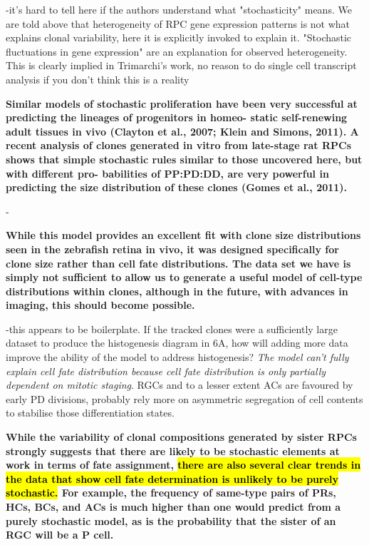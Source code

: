\documentclass{ut-thesis}
\begin{document}
\bigskip

-it's hard to tell here if the authors understand what "stochasticity" means. We are told above that heterogeneity of RPC gene expression patterns is not what explains clonal variability, here it is explicitly invoked to explain it. "Stochastic fluctuations in gene expression" are an explanation for observed heterogeneity. This is clearly implied in Trimarchi's work, no reason to do single cell transcript analysis if you don't think this is a reality

\bigskip

\textbf{
Similar models of stochastic proliferation have been very
successful at predicting the lineages of progenitors in homeo-
static self-renewing adult tissues in vivo (Clayton et al., 2007;
Klein and Simons, 2011). A recent analysis of clones generated
in vitro from late-stage rat RPCs shows that simple stochastic
rules similar to those uncovered here, but with different pro-
babilities of PP:PD:DD, are very powerful in predicting the size
distribution of these clones (Gomes et al., 2011).}

\bigskip

-

\bigskip

\textbf{While this
model provides an excellent fit with clone size distributions
seen in the zebrafish retina in vivo, it was designed specifically
for clone size rather than cell fate distributions. The data set
we have is simply not sufficient to allow us to generate a useful
model of cell-type distributions within clones, although in the
future, with advances in imaging, this should become possible.}

\bigskip

-this appears to be boilerplate. If the tracked clones were a sufficiently large dataset to produce the histogenesis diagram in 6A, how will adding more data improve the ability of the model to address histogenesis? \textit{The model can't fully explain cell fate distribution because cell fate distribution is only partially dependent on mitotic staging}. RGCs and to a lesser extent ACs are favoured by early PD divisions, probably rely more on asymmetric segregation of cell contents to stabilise those differentiation states.

\bigskip

\textbf{
While the variability of clonal compositions generated by sister
RPCs strongly suggests that there are likely to be stochastic
elements at work in terms of fate assignment, \hl{there are also
several clear trends in the data that show cell fate determination
is unlikely to be purely stochastic.} For example, the frequency of
same-type pairs of PRs, HCs, BCs, and ACs is much higher
than one would predict from a purely stochastic model, as is
the probability that the sister of an RGC will be a P cell.}
\end{document}
